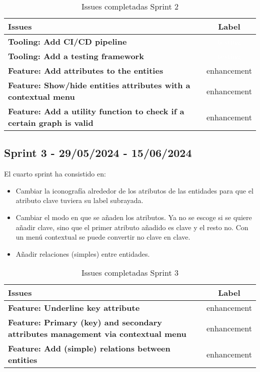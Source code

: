 
\begin{table}[ht!]
    \centering
    \resizebox{14cm}{!} {
    \begin{tabular}{|l|c|}
    \hline
    \rowcolor[rgb]{0.9, 0.9, 0.9}
    \textbf{Issues} & \textbf{Label} \\ \hline
    \textbf{Tooling: Add CI/CD pipeline} & \cellcolor[rgb]{0.0, 0.42, 0.46}\textcolor{white}{testing} \\ \hline 
    \textbf{Tooling: Add a testing framework} & \cellcolor[rgb]{0.0, 0.42, 0.46}\textcolor{white}{testing} \\ \hline 
    \textbf{Feature: Add attributes to the entities} & \cellcolor[rgb]{0.64, 0.93, 0.94}enhancement \\ \hline 
    \textbf{Feature: Show/hide entities attributes with a contextual menu} & \cellcolor[rgb]{0.64, 0.93, 0.94}enhancement \\ \hline 
    \textbf{Feature: Add a utility function to check if a certain graph is valid} & \cellcolor[rgb]{0.64, 0.93, 0.94}enhancement \\ \hline 
    \end{tabular}}
    \caption{Issues completadas Sprint 2}
\end{table}


\subsection{Sprint 3 - 29/05/2024 - 15/06/2024 }
El cuarto sprint ha consistido en:
\begin{itemize}
    \item Cambiar la iconografía alrededor de los atributos de las entidades para que el atributo clave tuviera su label subrayada.
    \item Cambiar el modo en que se añaden los atributos. Ya no se escoge si se quiere añadir clave, sino que el primer atributo añadido es clave y el resto no. Con un menú contextual se puede convertir no clave en clave.
    \item Añadir relaciones (simples) entre entidades.
\end{itemize}


\begin{table}[ht!]
    \centering
    \resizebox{14cm}{!} {
    \begin{tabular}{|l|c|}
    \hline
    \rowcolor[rgb]{0.9, 0.9, 0.9}
    \textbf{Issues} & \textbf{Label} \\ \hline
    \textbf{Feature: Underline key attribute} & \cellcolor[rgb]{0.64, 0.93, 0.94}enhancement \\ \hline 
    \textbf{Feature: Primary (key) and secondary attributes management via contextual menu} & \cellcolor[rgb]{0.64, 0.93, 0.94}enhancement \\ \hline 
    \textbf{Feature: Add (simple) relations between entities} & \cellcolor[rgb]{0.64, 0.93, 0.94}enhancement \\ \hline 
    \end{tabular}}
    \caption{Issues completadas Sprint 3}
\end{table}

